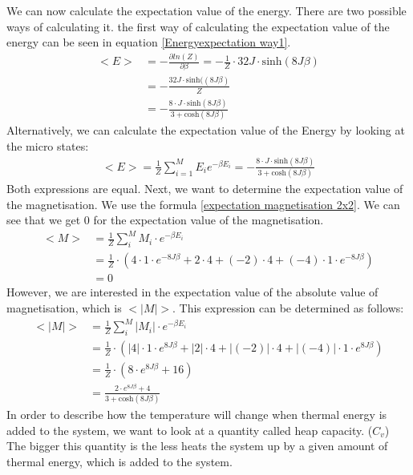 \documentclass[10pt,a4paper]{article}
\begin{document}
We can now calculate the expectation value of the energy. There are two possible ways of calculating it. the first way of calculating the expectation value of the energy can be seen in equation \ref{Energyexpectation way1}. 
\begin{align}
<E>&= - \frac{\partial ln(Z)}{\partial \beta} =-\frac{1}{Z} \cdot 32J  \cdot \mathrm{sinh}(8J \beta ) \\ \label{Energyexpectation way1}
&= -\frac{32 J \cdot \mathrm{sinh}((8J \beta )}{Z}\\
&=-\frac{8 \cdot J \cdot  \mathrm{sinh}(8J \beta ) }{3+\mathrm{cosh}(8J\beta)}
\end{align}
Alternatively, we can calculate the expectation value of the Energy by looking at the micro states:
\begin{align}
<E> = \frac{1}{Z} \sum_{i=1}^{M} E_i e^{- \beta E_i}=-\frac{8 \cdot J \cdot  \mathrm{sinh}(8J \beta ) }{3+\mathrm{cosh}(8J\beta)}
\end{align}
Both expressions are equal. Next, we want to determine the expectation value of the magnetisation. We use the formula \ref{expectation magnetisation 2x2}. We can see that we get 0 for the expectation value of the magnetisation. 
\begin{align}
<M> &= \frac{1}{Z} \sum_{i}^M M_i \cdot e^{- \beta E_i }\\\label{expectation magnetisation 2x2}
&= \frac{1}{Z} \cdot \left( 4 \cdot 1 \cdot e^{-8J\beta}+ 2 \cdot 4+(-2) \cdot 4 + (-4) \cdot 1 \cdot e^{-8J \beta } \right)\\
&=0
\end{align}
However, we are interested in the expectation value of the absolute value of magnetisation, which is $<|M|>$. This expression can be determined as follows:
\begin{align}
<|M|> &= \frac{1}{Z} \sum_{i}^M |M_i| \cdot e^{- \beta E_i }\\\label{expectation absolute magnetisation 2x2}
&= \frac{1}{Z} \cdot \left( |4| \cdot 1 \cdot e^{8J\beta}+ |2| \cdot 4+|(-2)| \cdot 4 + |(-4)| \cdot 1 \cdot e^{8J \beta } \right)\\
&=\frac{1}{Z} \cdot \left( 8 \cdot e^{8J\beta} +16 \right)\\
&= \frac{2 \cdot e^{8J\beta}+4}{3+ \mathrm{cosh}(8J\beta)}
\end{align}
In order to describe how the temperature will change when thermal energy is added to the system, we want to look at a quantity called heap capacity. ($C_v$) The bigger this quantity is the less heats the system up by a given amount of thermal energy, which is added to the system.  
\end{document}
